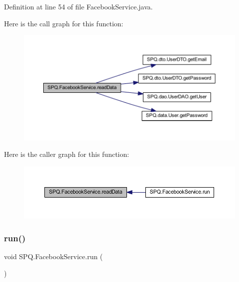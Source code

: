 Definition at line 54 of file Facebook\+Service.\+java.

Here is the call graph for this function\+:
\nopagebreak
\begin{figure}[H]
\begin{center}
\leavevmode
\includegraphics[width=350pt]{class_s_p_q_1_1_facebook_service_a087e3aab2d870149c0ef74f3adf75efa_cgraph}
\end{center}
\end{figure}
Here is the caller graph for this function\+:
\nopagebreak
\begin{figure}[H]
\begin{center}
\leavevmode
\includegraphics[width=350pt]{class_s_p_q_1_1_facebook_service_a087e3aab2d870149c0ef74f3adf75efa_icgraph}
\end{center}
\end{figure}
\mbox{\label{class_s_p_q_1_1_facebook_service_a24a62bc6a32966419548314bc417abfb}} 
\subsubsection{\texorpdfstring{run()}{run()}}
{\footnotesize\ttfamily void S\+P\+Q.\+Facebook\+Service.\+run (\begin{DoxyParamCaption}{ }\end{DoxyParamCaption})}



